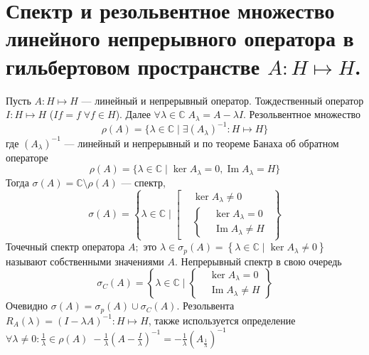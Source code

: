 \documentclass[12pt]{article}
\renewcommand{\Im}{\operatorname{Im}}
\newcommand{\Al}{A_\lambda}
\newcommand{\Alo}{(\Al)^{-1}}
\newcommand{\Rez}{(I - \lambda A)^{-1}}
\begin{document}
\newtheorem{Theor}{Теорема}
\newtheorem{Opr}{Опреление}
\newtheorem{Prim}{Пример}
\newtheorem{Upr}{Упражнение}
\newtheorem{Nabl}{Наблюдение}
\newtheorem{Zam}{Замечание}
\section*{Спектр и резольвентное множество линейного непрерывного оператора в гильбертовом пространстве $A : H \mapsto H$.}
Пусть $A : H \mapsto H$ --- линейный и непрерывный оператор.
Тождественный оператор $I : H \mapsto H$ ($If = f\;\forall f \in H$).
Далее $\forall \lambda \in \mathbb C\;A_\lambda = A - \lambda I$.
Резольвентное множество
$$
\rho(A) = \{ \lambda \in \mathbb C \mid \exists (A_\lambda)^{-1} : H \mapsto H \}
$$
где $\Alo$ --- линейный и непрерывный и по теореме Банаха об обратном операторе
$$
\rho(A) = \{ \lambda \in \mathbb C \mid \ker A_\lambda = 0, \Im A_\lambda = H \}
$$
Тогда $\sigma(A) = \mathbb C \setminus \rho(A)$ --- спектр, 
$$
\sigma(A) = \left \{ \lambda \in \mathbb C \mid 
\left [
    \begin{aligned}
        &\ker A_\lambda \ne 0\\
        &\left \{
            \begin{aligned}
                &\ker \Al = 0\\
                &\Im \Al \ne H
            \end{aligned}
            \right.
    \end{aligned}
\right.\right\}
$$
Точечный спектр оператора $A;$ это $\lambda \in \sigma_p(A)= \left \{ \lambda \in \mathbb C \mid \ker A_\lambda \ne 0 \right\}$ называют собственными значениями $A$.
Непрерывный спектр в свою очередь 
$$\sigma_C(A) =  \left \{ \lambda \in \mathbb C \mid 
\left\{
    \begin{aligned}
                &\ker \Al = 0\\
                &\Im \Al \ne H
    \end{aligned}
\right.\right \}
$$
Очевидно $\sigma(A) = \sigma_p(A) \cup \sigma_C(A)$.
Резольвента $R_A(\lambda) = \Rez : H \mapsto H$, также используется определение
$\forall \lambda \ne 0\colon \frac{1}{\lambda} \in \rho(A)\;-\frac{1}{\lambda}(A - \frac{I}{\lambda})^{-1} = -\frac{1}{\lambda}(A_{\frac1{\lambda}})^{-1}$
\end{document}
